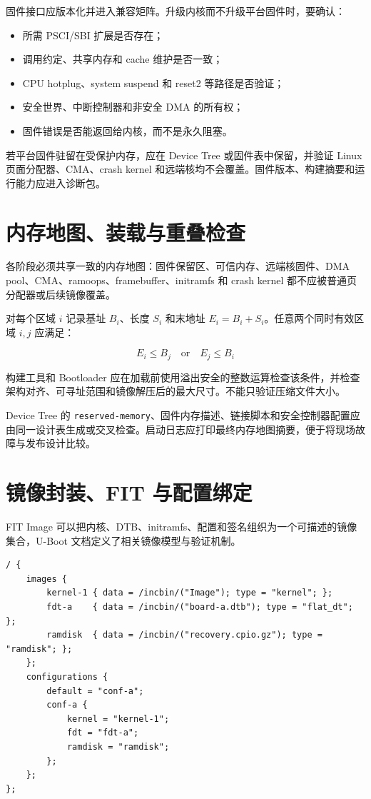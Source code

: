 固件接口应版本化并进入兼容矩阵。升级内核而不升级平台固件时，要确认：

\begin{itemize}
  \item 所需 PSCI/SBI 扩展是否存在；
  \item 调用约定、共享内存和 cache 维护是否一致；
  \item CPU hotplug、system suspend 和 reset2 等路径是否验证；
  \item 安全世界、中断控制器和非安全 DMA 的所有权；
  \item 固件错误是否能返回给内核，而不是永久阻塞。
\end{itemize}

若平台固件驻留在受保护内存，应在 Device Tree 或固件表中保留，并验证 Linux 页面分配器、CMA、crash kernel 和远端核均不会覆盖。固件版本、构建摘要和运行能力应进入诊断包。

\section{内存地图、装载与重叠检查}

各阶段必须共享一致的内存地图：固件保留区、可信内存、远端核固件、DMA pool、CMA、ramoops、framebuffer、initramfs 和 crash kernel 都不应被普通页分配器或后续镜像覆盖。

对每个区域 $i$ 记录基址 $B_i$、长度 $S_i$ 和末地址 $E_i=B_i+S_i$。任意两个同时有效区域 $i,j$ 应满足：

\begin{equation}
  E_i \le B_j \quad \text{or} \quad E_j \le B_i
\end{equation}

构建工具和 Bootloader 应在加载前使用溢出安全的整数运算检查该条件，并检查架构对齐、可寻址范围和镜像解压后的最大尺寸。不能只验证压缩文件大小。

Device Tree 的 \texttt{reserved-memory}、固件内存描述、链接脚本和安全控制器配置应由同一设计表生成或交叉检查。启动日志应打印最终内存地图摘要，便于将现场故障与发布设计比较。

\section{镜像封装、FIT 与配置绑定}

FIT Image 可以把内核、DTB、initramfs、配置和签名组织为一个可描述的镜像集合，U-Boot 文档定义了相关镜像模型与验证机制\cite{uboot-doc}。

\begin{lstlisting}[language=dts,caption={FIT 配置关系示意}]
/ {
    images {
        kernel-1 { data = /incbin/("Image"); type = "kernel"; };
        fdt-a    { data = /incbin/("board-a.dtb"); type = "flat_dt"; };
        ramdisk  { data = /incbin/("recovery.cpio.gz"); type = "ramdisk"; };
    };
    configurations {
        default = "conf-a";
        conf-a {
            kernel = "kernel-1";
            fdt = "fdt-a";
            ramdisk = "ramdisk";
        };
    };
};
\end{lstlisting}

